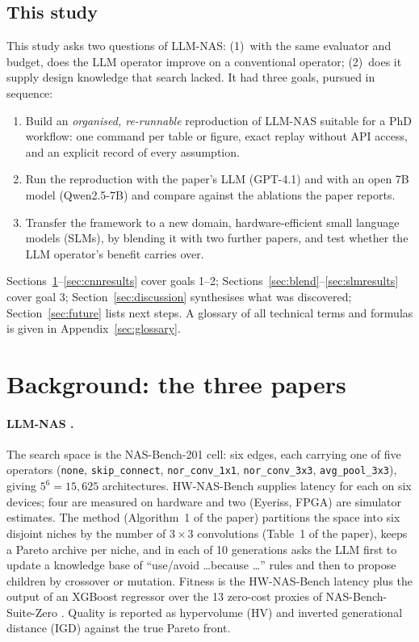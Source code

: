 \documentclass[11pt,a4paper]{article}
\newcommand{\code}[1]{\texttt{#1}}
\begin{document}
\subsection{This study}
This study asks two questions of LLM-NAS: (1)~with the same evaluator and budget, does the LLM operator improve on a conventional operator; (2)~does it supply design knowledge that search lacked. It had three goals, pursued in sequence:
\begin{enumerate}[nosep]
  \item Build an \emph{organised, re-runnable} reproduction of LLM-NAS suitable for a PhD workflow: one command per table or figure, exact replay without API access, and an explicit record of every assumption.
  \item Run the reproduction with the paper's LLM (GPT-4.1) and with an open 7B model (Qwen2.5-7B) and compare against the ablations the paper reports.
  \item Transfer the framework to a new domain, hardware-efficient small language models (SLMs), by blending it with two further papers, and test whether the LLM operator's benefit carries over.
\end{enumerate}
Sections~\ref{sec:background}--\ref{sec:cnnresults} cover goals 1--2; Sections~\ref{sec:blend}--\ref{sec:slmresults} cover goal 3; Section~\ref{sec:discussion} synthesises what was discovered; Section~\ref{sec:future} lists next steps. A glossary of all technical terms and formulas is given in Appendix~\ref{sec:glossary}.

\section{Background: the three papers}\label{sec:background}

\paragraph{LLM-NAS \cite{llmnas}.} The search space is the NAS-Bench-201 cell: six edges, each carrying one of five operators (\code{none}, \code{skip\_connect}, \code{nor\_conv\_1x1}, \code{nor\_conv\_3x3}, \code{avg\_pool\_3x3}), giving $5^6=15{,}625$ architectures. HW-NAS-Bench \cite{hwnasbench} supplies latency for each on six devices; four are measured on hardware and two (Eyeriss, FPGA) are simulator estimates. The method (Algorithm~1 of the paper) partitions the space into six disjoint niches by the number of $3{\times}3$ convolutions (Table~1 of the paper), keeps a Pareto archive per niche, and in each of 10 generations asks the LLM first to update a knowledge base of ``use/avoid \ldots because \ldots'' rules and then to propose children by crossover or mutation. Fitness is the HW-NAS-Bench latency plus the output of an XGBoost regressor over the 13 zero-cost proxies of NAS-Bench-Suite-Zero \cite{nbsz}. Quality is reported as hypervolume (HV) and inverted generational distance (IGD) against the true Pareto front.
\end{document}
